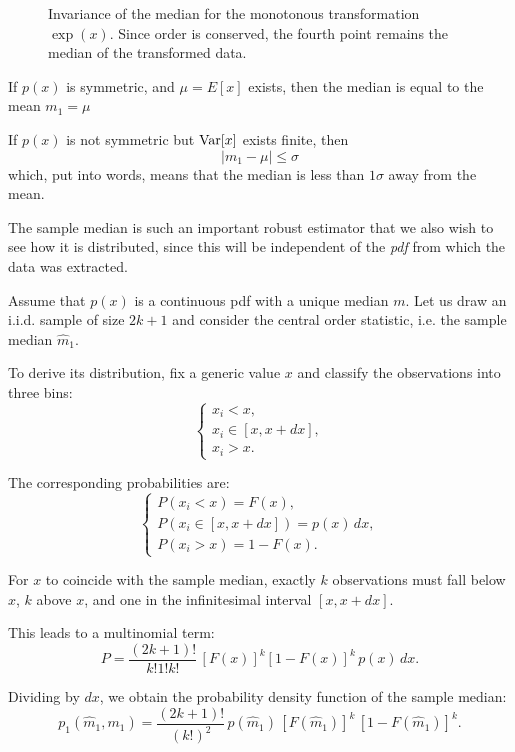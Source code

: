\begin{figure}[H]
	\centering
	
	\caption{Invariance of the median for the monotonous transformation $\exp(x)$. Since order is conserved, the fourth point remains the median of the transformed data.}
\end{figure}


\begin{theorem}
	If $p(x)$ is symmetric, and $\mu = E[x]$ exists, then the median is equal to the mean $m_1 = \mu$
	
	If $p(x)$ is not symmetric but $\operatorname{Var}[x]$ exists finite, then 
	\[
	\left|m_1-\mu\right| \leq \sigma
	\]
	which, put into words, means that the median is less than $1\sigma$ away from the mean. 
\end{theorem}

The sample median is such an important robust estimator that we also wish to see how it is distributed, since this will be independent of the \emph{pdf} from which the data was extracted.

Assume that $p(x)$ is a continuous pdf with a unique median $m$. Let us draw an i.i.d. sample of size $2k+1$ and consider the central order statistic, i.e. the sample median $\hat m_1$.

To derive its distribution, fix a generic value $x$ and classify the observations into three bins:
\[
\begin{cases}
	x_i < x, \\
	x_i \in [x, x+dx], \\
	x_i > x.
\end{cases}
\]

The corresponding probabilities are:
\[
\begin{cases}
	P(x_i < x) = F(x), \\
	P(x_i \in [x,x+dx]) = p(x)\,dx, \\
	P(x_i > x) = 1 - F(x).
\end{cases}
\]

For $x$ to coincide with the sample median, exactly $k$ observations must fall below $x$, $k$ above $x$, and one in the infinitesimal interval $[x,x+dx]$.

This leads to a multinomial term:
\[
P =
\frac{(2k+1)!}{k!1!k!}\,[F(x)]^k [1-F(x)]^k \, p(x)\,dx.
\]

Dividing by $dx$, we obtain the probability density function of the sample median:
\begin{equation}
	p_1(\hat m_1, m_1)
	=
	\frac{(2k+1)!}{(k!)^2}
	\, p(\hat m_1)\,
	[F(\hat m_1)]^k\,[1-F(\hat m_1)]^k.
	\label{eq:median_pdf}
\end{equation}

